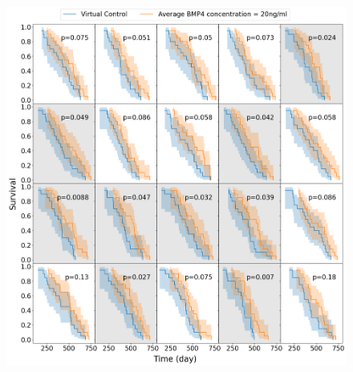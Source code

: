 \documentclass[
  letterpaper,
]{scrreprt}
\theoremstyle{definition}
\theoremstyle{remark}
\begin{document}
\begin{figure}
\begin{minipage}{0.50\linewidth}
{\includegraphics{images/png/virtual_trial_BMP4_500_rho_case_5.png}

}

\subcaption{\label{fig-example3}}

\end{minipage}%
\newline
\begin{minipage}{0.50\linewidth}

\end{minipage}
\end{figure}
\end{document}
